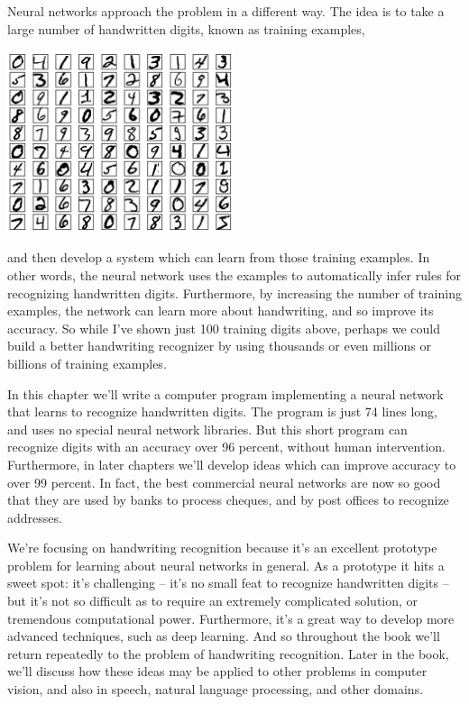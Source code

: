 \documentclass[a4paper,twoside,10pt]{book}
\begin{document}
Neural networks approach the problem in a different way. The idea is to take a large number of handwritten digits, known as training examples,
\begin{center}
	\includegraphics[width=0.5\textwidth]{./figures/ch1/mnist_100_digits}
\end{center}
and then develop a system which can learn from those training examples. In other words, the neural network uses the examples to automatically infer rules for recognizing handwritten digits. Furthermore, by increasing the number of training examples, the network can learn more about handwriting, and so improve its accuracy. So while I've shown just 100 training digits above, perhaps we could build a better handwriting recognizer by using thousands or even millions or billions of training examples.

In this chapter we'll write a computer program implementing a neural network that learns to recognize handwritten digits. The program is just 74 lines long, and uses no special neural network libraries. But this short program can recognize digits with an accuracy over 96 percent, without human intervention. Furthermore, in later chapters we'll develop ideas which can improve accuracy to over 99 percent. In fact, the best commercial neural networks are now so good that they are used by banks to process cheques, and by post offices to recognize addresses.

We're focusing on handwriting recognition because it's an excellent prototype problem for learning about neural networks in general. As a prototype it hits a sweet spot: it's challenging -- it's no small feat to recognize handwritten digits -- but it's not so difficult as to require an extremely complicated solution, or tremendous computational power. Furthermore, it's a great way to develop more advanced techniques, such as deep learning. And so throughout the book we'll return repeatedly to the problem of handwriting recognition. Later in the book, we'll discuss how these ideas may be applied to other problems in computer vision, and also in speech, natural language processing, and other domains.
\end{document}
